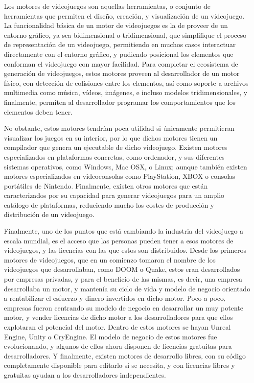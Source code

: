 Los motores de videojuegos son aquellas herramientas, o conjunto de herramientas que permiten el diseño, creación, y visualización de un videojuego. La funcionalidad básica de un motor de videojuegos es la de proveer de un entorno gráfico, ya sea bidimensional o tridimensional, que simplifique el proceso de representación de un videojuego, permitiendo en muchos casos interactuar directamente con el entorno gráfico, y pudiendo posicional los elementos que conforman el videojuego con mayor facilidad. Para completar el ecosistema de generación de videojuegos, estos motores proveen al desarrollador de un motor físico, con detección de colisiones entre los elementos, así como soporte a archivos multimedia como música, vídeos, imágenes, e incluso modelos tridimensionales, y finalmente, permiten al desarrollador programar los comportamientos que los elementos deben tener.

No obstante, estos motores tendrían poca utilidad si únicamente permitieran visualizar los juegos en su interior, por lo que dichos motores tienen un compilador que genera un ejecutable de dicho videojuego. Existen motores especializados en plataformas concretas, como ordenador, y sus diferentes sistemas operativos, como Windows, Mac OSX, o Linux; aunque también existen motores especializados en videoconsolas como PlayStation, XBOX o consolas portátiles de Nintendo. Finalmente, existen otros motores que están caracterizados por su capacidad para generar videojuegos para un amplio catálogo de plataformas, reduciendo mucho los costes de producción y distribución de un videojuego.

Finalmente, uno de los puntos que está cambiando la industria del videojuego a escala mundial, es el acceso que las personas pueden tener a esos motores de videojuegos, y las licencias con las que estos son distribuidos. Desde los primeros motores de videojuegos, que en un comienzo tomaron el nombre de los videojuegos que desarrollaban, como DOOM o Quake, estos eran desarrollados por empresas privadas, y para el beneficio de las mismas, es decir, una empresa desarrollaba un motor, y mantenía su ciclo de vida y modelo de negocio orientado a rentabilizar el esfuerzo y dinero invertidos en dicho motor. Poco a poco, empresas fueron centrando su modelo de negocio en desarrollar un muy potente motor, y vender licencias de dicho motor a los desarrolladores para que ellos explotaran el potencial del motor. Dentro de estos motores se hayan Unreal Engine, Unity o CryEngine. El modelo de negocio de estos motores fue evolucionando, y algunos de ellos ahora disponen de licencias gratuitas para desarrolladores. Y finalmente, existen motores de desarrollo libres, con su código completamente disponible para editarlo si se necesita, y con licencias libres y gratuitas ayudan a los desarrolladores independientes.

